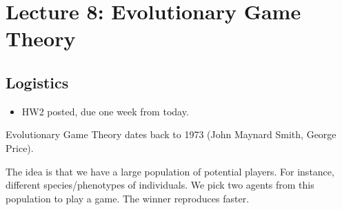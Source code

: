 \section{Lecture 8: Evolutionary Game Theory}
\newsection
\subsection*{Logistics}
\begin{itemize}
    \item HW2 posted, due one week from today.
\end{itemize}

Evolutionary Game Theory dates back to 1973 (John Maynard Smith, George Price).

The idea is that we have a large population of potential players. For instance, different species/phenotypes of individuals. We pick two agents from this population to play a game. The winner reproduces faster. 

